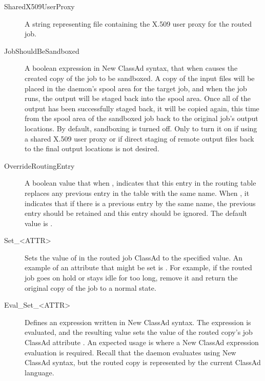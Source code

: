 \begin{description}
\item[SharedX509UserProxy]
A string representing file containing the X.509 user proxy for the routed job.

\item[JobShouldBeSandboxed] A boolean expression in New ClassAd syntax,
that when  causes the created copy of the job to be sandboxed.
A copy of the input files will be placed in the
 daemon's spool area for the target job,
and when the job runs,
the output will be staged back into the spool area.
Once all of the output has been successfully staged back,
it will be copied again,
this time from the spool area of the sandboxed job back to the
original job's output locations.
By default, sandboxing is turned off.
Only to turn it on if using a shared X.509
user proxy or if direct staging of remote output files
back to the final output locations is not desired.

\item[OverrideRoutingEntry] A boolean value that when ,
indicates that this entry
in the routing table replaces any previous entry in the table
with the same name.
When , it indicates that if there is a
previous entry by the same name, the previous entry should be retained
and this entry should be ignored.
The default value is .

\item[Set\_<ATTR>] Sets the value of  in the routed
job ClassAd to the specified value.  An example of
an attribute that might be set is .
For example, if the routed job goes on hold or stays idle for too long,
remove it and return the original copy of the job to a normal state.

\item[Eval\_Set\_<ATTR>] Defines an expression written in New ClassAd
syntax. The expression is evaluated, and the resulting value
sets the value of the routed copy's job ClassAd attribute .
An expected usage is where a New ClassAd expression evaluation is required.
Recall that the  daemon evaluates using New ClassAd
syntax, but the routed copy is represented by the current ClassAd language.


\end{description}
